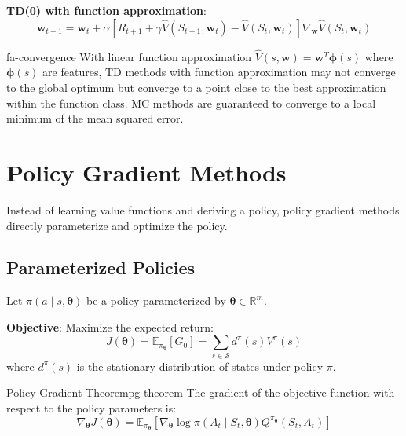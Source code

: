 \documentclass[a4paper, 11pt]{article}
\numberwithin{equation}{section}
\theoremstyle{plain}
\theoremstyle{definition}
\newcommand{\E}{{\mathbb E}}
\newcommand{\1}{{\mathbbm 1}}
\newcommand{\mb}[1]{\mathbf{#1}}
\newcommand{\mc}[1]{\mathcal{#1}}
\newcommand{\R}{{\mathbb{R}}}
\begin{document}
	\textbf{TD(0) with function approximation}:
	\begin{equation}\label{td-fa}
		\mb{w}_{t+1} = \mb{w}_t + \alpha [R_{t+1} + \gamma \hat{V}(S_{t+1}, \mb{w}_t) - \hat{V}(S_t, \mb{w}_t)] \nabla_{\mb{w}} \hat{V}(S_t, \mb{w}_t)
	\end{equation}
	
	\begin{frema}{}{fa-convergence}
		With linear function approximation $\hat{V}(s, \mb{w}) = \mb{w}^T \mb{\phi}(s)$ where $\mb{\phi}(s)$ are features, TD methods with function approximation may not converge to the global optimum but converge to a point close to the best approximation within the function class. MC methods are guaranteed to converge to a local minimum of the mean squared error.
	\end{frema}
	
	\section{Policy Gradient Methods}
	
	Instead of learning value functions and deriving a policy, policy gradient methods directly parameterize and optimize the policy.
	
	\subsection{Parameterized Policies}
	
	Let $\pi(a\;|\; s, \boldsymbol{\theta})$ be a policy parameterized by $\boldsymbol{\theta} \in \R^m$.
	
	\textbf{Objective}: Maximize the expected return:
	\begin{equation}\label{pg-objective}
		J(\boldsymbol{\theta}) = \E_{\pi_{\boldsymbol{\theta}}}[G_0] = \sum_{s \in \mc{S}} d^{\pi}(s) V^{\pi}(s)
	\end{equation}
	where $d^{\pi}(s)$ is the stationary distribution of states under policy $\pi$.
	
	\begin{ftheo}{Policy Gradient Theorem}{pg-theorem}
		The gradient of the objective function with respect to the policy parameters is:
		\begin{equation}\label{pg-gradient}
			\nabla_{\boldsymbol{\theta}} J(\boldsymbol{\theta}) = \E_{\pi_{\boldsymbol{\theta}}} \left[ \nabla_{\boldsymbol{\theta}} \log \pi(A_t\;|\; S_t, \boldsymbol{\theta}) Q^{\pi_{\boldsymbol{\theta}}}(S_t, A_t) \right]
		\end{equation}
	\end{ftheo}
	
\end{document}
